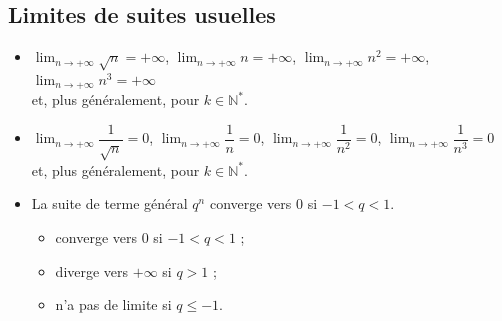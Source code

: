 \documentclass[11pt,twoside, openany]{extbook}
\begin{document}
\subsection{Limites de suites usuelles}
\begin{propa}
\begin{itemize}
   \item[$\bullet$]  $\displaystyle \lim_{n\rightarrow +\infty} \sqrt{n}=+\infty$, $\displaystyle \lim_{n\rightarrow +\infty} n=+\infty$, $\displaystyle \lim_{n\rightarrow +\infty} n^2=+\infty$, $\displaystyle \lim_{n\rightarrow +\infty} n^3=+\infty$ \vspace{0.5em} \\ \hspace*{2cm} 
    et, plus généralement,  pour $k\in\mathbb{N}^*$.
   \item[$\bullet$]  $\displaystyle \lim_{n\rightarrow +\infty} \dfrac{1}{\sqrt{n}}=0$, $\displaystyle \lim_{n\rightarrow +\infty} \dfrac{1}{n}=0$, $\displaystyle \lim_{n\rightarrow +\infty} \dfrac{1}{n^2}=0$, $\displaystyle \lim_{n\rightarrow +\infty} \dfrac{1}{n^3}=0$ \vspace{0.5em} \\  \vspace{0.5em} \hspace*{2cm} et, plus généralement,  pour $k\in\mathbb{N}^*$.
   \item[$\bullet$]  La suite de terme général $q^n$ converge vers $0$ si $-1<q<1$.
        \begin{itemize}
           \item converge vers $0$ si $-1<q<1$ ;
           \item diverge vers $+\infty$ si $q>1$ ;
           \item n'a pas de limite si $q\leqslant -1$.
        \end{itemize}  
  \end{itemize}

\end{propa}
\end{document}

